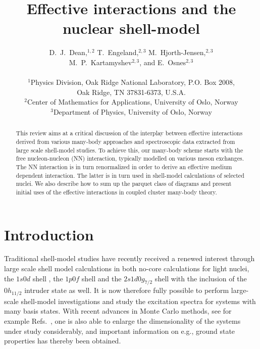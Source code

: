 \documentclass[twoside,12pt]{article}
\begin{document}
\title{Effective interactions and the nuclear shell-model}
\author{D.~J.~Dean,$^{1,2}$ T.~Engeland,$^{2,3}$ M.~Hjorth-Jensen,$^{2,3}$\\
M.~P.~Kartamyshev$^{2,3}$, and E.~Osnes$^{2,3}$\\
\\
$^{1}$Physics Division, Oak Ridge National Laboratory,
P.O. Box 2008,\\  Oak Ridge, TN 37831-6373, U.S.A.\\
$^{2}$Center of Mathematics for Applications, University of Oslo, Norway\\
$^{3}$Department of Physics, University of Oslo, Norway}

\maketitle
\begin{abstract}
This review aims at a critical discussion of  the interplay between
effective interactions derived from various many-body approaches
and spectroscopic data extracted from large scale shell-model
studies. To achieve this,
our many-body scheme starts with
the free nucleon-nucleon (NN)
interaction, typically modelled
on various meson exchanges. The NN interaction
is in turn renormalized in order to derive an effective medium
dependent interaction. The latter is in turn used
in shell-model calculations of selected nuclei. We also describe
how to sum up the parquet class of diagrams and present
initial uses of the effective interactions in coupled cluster
many-body theory. 
\end{abstract}

\tableofcontents

\section{Introduction}\label{sec:sec1}


Traditional shell-model studies
have recently received a renewed
interest through large scale shell model calculations
in both no-core calculations \cite{bruce1,bruce2,bruce3,bruce4} for light nuclei, 
the $1s0d$ shell \cite{alex}, the $1p0f$ shell and the $2s1d0g_{7/2}$ shell with
the inclusion of the $0h_{11/2}$ intruder state as well.
It is now therefore fully possible to perform large-scale
shell-model investigations
and study the excitation spectra
for systems with
many basis states. With recent advances in
Monte Carlo methods, see for example 
Refs.~\cite{taka1,r:smmc_pr, vijay,ndrops97,bob1,bob2,bob3}, one is also
able to enlarge the dimensionality
of the systems under study considerably,
and important information on e.g., ground state properties
has thereby been obtained.
\end{document}
